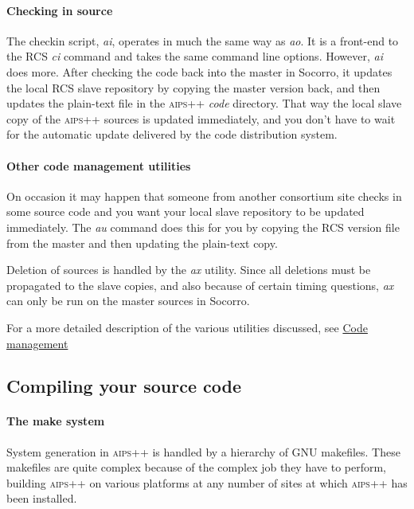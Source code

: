 \paragraph{Checking in source}
The checkin script, \textit{ai}, operates in much the same way as \textit{ao}.  It is a
front-end to the RCS \textit{ci} command and takes the same command line options.
However, \textit{ai} does more.  After checking the code back into the master in
Socorro, it updates the local RCS slave repository by copying the
master version back, and then updates the plain-text file in the \textsc{aips++}
\textsl{code} directory.  That way the local slave copy of the \textsc{aips++}
sources is updated immediately, and you don't have to wait for the automatic
update delivered by the code distribution system.

\paragraph{Other code management utilities}
On occasion it may happen that someone from another consortium site checks in
some source code and you want your local slave repository to be updated
immediately.  The \textit{au} command does this for you by copying the RCS version
file from the master and then updating the plain-text copy.

Deletion of sources is handled by the \textit{ax} utility.  Since all deletions
must be propagated to the slave copies, and also because of certain timing
questions, \textit{ax} can only be run on the master sources in Socorro.

For a more detailed description of the various utilities discussed, see
\hyperref{Code management}{Code management (see AIPS++ System Manual, Section }{for more details)}{Code management}


\label{Compilation}
\subsection{Compiling your source code}

\paragraph{The make system}
System generation in \textsc{aips++} is handled by a hierarchy of GNU makefiles.
These makefiles are quite complex because of the complex job they have to
perform, building \textsc{aips++} on various platforms at any number of sites at
which \textsc{aips++} has been installed.

